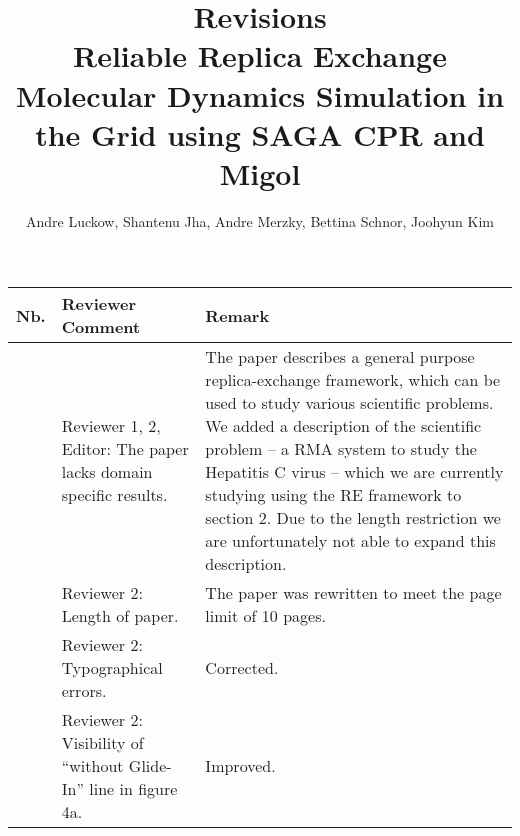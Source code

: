 \documentclass[]{article}
\title{\textbf{Revisions}\\Reliable Replica Exchange Molecular Dynamics Simulation in the Grid using SAGA CPR 
and Migol}
\author{Andre Luckow, Shantenu Jha, Andre Merzky, Bettina Schnor, Joohyun Kim}
\newcounter{mycounter}
\newcommand{\COUNTER}{\addtocounter{mycounter}{1} \arabic{mycounter}}
\begin{document}
\maketitle


\begin{longtable}{|p{}|p{}|p{}|}
\hline 

\textbf{Nb.} &\textbf{Reviewer Comment} &\textbf{Remark} \\
\hline
\endhead
\COUNTER&

Reviewer 1, 2, Editor: The paper lacks domain specific results.

&The paper describes a general purpose replica-exchange framework, which 
can be used to study various scientific problems. We added a description of the scientific
problem -- a RMA system to study the Hepatitis C virus -- which we are currently 
studying using the RE framework to section 2. Due to the length restriction we are unfortunately
not able to expand this description.\\
 
\hline
\COUNTER&

Reviewer 2: Length of paper.

&The paper was rewritten to meet the page limit of 10 pages.\\
\hline
\COUNTER&

Reviewer 2: Typographical errors.

&Corrected.\\
\hline
\COUNTER&

Reviewer 2: Visibility of ``without Glide-In'' line in figure 4a.

&Improved.\\
\hline

\end{longtable} 
\end{document}
